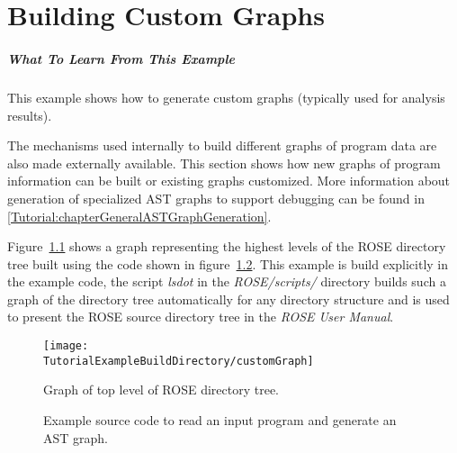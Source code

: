 \chapter{Building Custom Graphs}
\label{Tutorial:chapterCustomGraphs}

\paragraph{What To Learn From This Example}
This example shows how to generate custom graphs (typically used for analysis results).

     The mechanisms used internally to build different graphs of program data
are also made externally available. This section shows how new graphs of 
program information can be built or existing graphs customized.
More information about generation of specialized AST graphs to support debugging 
can be found in \ref{Tutorial:chapterGeneralASTGraphGeneration}.

Figure~\ref{tutorial:exampleCustomGraph} shows a graph representing the
highest levels of the ROSE directory tree built using the code shown
in figure~\ref{Tutorial:exampleCustomGraphCode}.  This example is build
explicitly in the example code, the script {\em lsdot} in the 
{\em ROSE/scripts/} directory builds such a graph of the directory tree 
automatically for any directory structure and is used to present the ROSE 
source directory tree in the {\em ROSE User Manual}.


\begin{figure}[!h]
\texttt{[image: \\TutorialExampleBuildDirectory/customGraph]}
\caption{Graph of top level of ROSE directory  tree.}
\label{tutorial:exampleCustomGraph}
\end{figure}



\begin{figure}[!h]
{\indent
{\mySmallFontSize

\begin{latexonly}
   
\end{latexonly}

\begin{htmlonly}
   
\end{htmlonly}

}
}
\caption{Example source code to read an input program and generate an AST graph.}
\label{Tutorial:exampleCustomGraphCode}
\end{figure}


